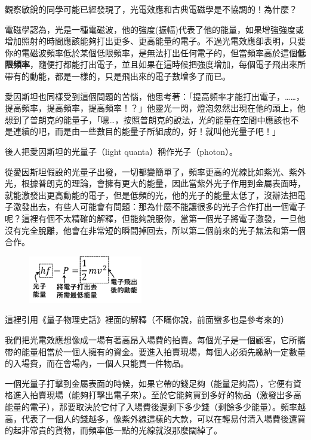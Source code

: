 觀察敏銳的同學可能已經發現了，光電效應和古典電磁學是不協調的！為什麼？

電磁學認為，光是一種電磁波，他的強度(振幅)代表了他的能量，如果增強強度或增加照射的時間應該能夠打出更多、更高能量的電子。不過光電效應卻表明，只要你的電磁波頻率低於某個低限頻率，是無法打出任何電子的，但當頻率高於這個\textbf{低限頻率}，隨便打都能打出電子，並且如果在這時候把強度增加，每個電子飛出來所帶有的動能，都是一樣的，只是飛出來的電子數增多了而已。

愛因斯坦也同樣受到這個問題的苦惱，他思考著：「提高頻率才能打出電子，……，提高頻率，提高頻率，提高頻率！？」他靈光一閃，燈泡忽然出現在他的頭上，他想到了普朗克的能量子，「嗯…，按照普朗克的說法，光的能量在空間中應該也不是連續的吧，而是由一些數目的能量子所組成的，好！就叫他光量子吧！」

後人把愛因斯坦的光量子（light quanta）稱作光子（photon）。

從愛因斯坦假設的光量子出發，一切都變簡單了，頻率更高的光線比如紫光、紫外光，根據普朗克的理論，會擁有更大的能量，因此當紫外光子作用到金屬表面時，就能激發出更高動能的電子，但是低頻的光，他的光子的能量太低了，沒辦法把電子激發出去，有些人可能會有問題：那為什麼不能讓很多的光子合作打出一個電子呢？這裡有個不太精確的解釋，但能夠說服你，當第一個光子將電子激發，一旦他沒有完全脫離，他會在非常短的瞬間掉回去，所以第二個前來的光子無法和第一個合作。

\begin{figure}[H]
\centering
\graphicspath{{physics/}}
\includegraphics[width=5cm, center]{photon.png}
\label{fig:photon}
\end{figure}

這裡引用《量子物理史話》裡面的解釋（不瞞你說，前面蠻多也是參考來的）

{\Kai 我們把光電效應想像成一場有著高昂入場費的拍賣。每個光子是一個顧客，它所攜帶的能量相當於一個人擁有的資金。要進入拍賣現場，每個人必須先繳納一定數量的入場費，而在會場內，一個人只能買一件物品。}

{\Kai 一個光量子打擊到金屬表面的時候，如果它帶的錢足夠（能量足夠高），它便有資格進入拍賣現場（能夠打擊出電子來）。至於它能夠買到多好的物品（激發出多高能量的電子），那要取決於它付了入場費後還剩下多少錢（剩餘多少能量）。頻率越高，代表了一個人的錢越多，像紫外線這樣的大款，可以在輕易付清入場費後還買的起非常貴的貨物，而頻率低一點的光線就沒那麼闊綽了。}

